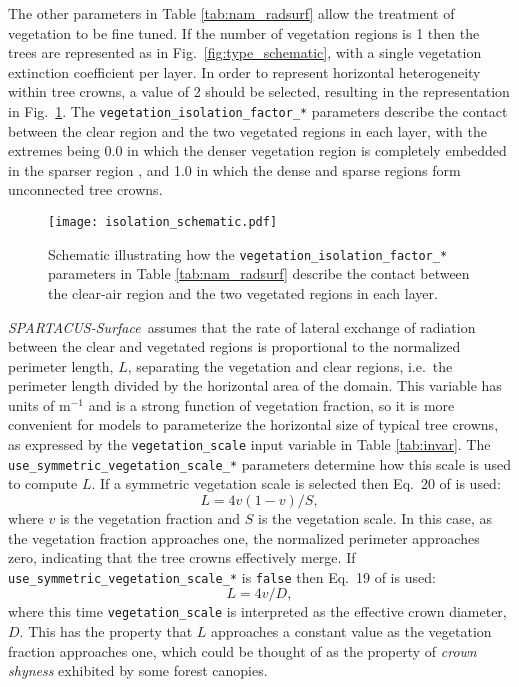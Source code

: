 \documentclass[a4,oneside]{article}
\def\codesize{\small}
\def\spsurf{\emph{SPARTACUS-Surface}}
\def\code#1{{\codesize\texttt{#1}}}
\begin{document}
The other parameters in Table \ref{tab:nam_radsurf} allow the
treatment of vegetation to be fine tuned. If the number of vegetation
regions is 1 then the trees are represented as in
Fig.\ \ref{fig:type_schematic}, with a single vegetation extinction
coefficient per layer.  In order to represent horizontal heterogeneity
within tree crowns, a value of 2 should be selected, resulting in the
representation in Fig.\ \ref{fig:isolation_schematic}. The
\code{vegetation\_isolation\_factor\_*} parameters describe the
contact between the clear region and the two vegetated regions in each
layer, with the extremes being 0.0 in which the denser vegetation
region is completely embedded in the sparser region \cite[the
  assumption used by][]{Hogan+2018}, and 1.0 in which the dense and
sparse regions form unconnected tree crowns.

\begin{figure}[b!]
  \centerline{\texttt{[image: isolation\_schematic.pdf]}}
  \caption{\label{fig:isolation_schematic}Schematic illustrating how
    the \code{vegetation\_isolation\_factor\_*} parameters in Table
    \ref{tab:nam_radsurf} describe the contact between the clear-air
    region and the two vegetated regions in each layer.}
\end{figure}

\spsurf\ assumes that the rate of lateral exchange of radiation
between the clear and vegetated regions is proportional to the
normalized perimeter length, $L$, separating the vegetation and clear
regions, i.e.\ the perimeter length divided by the horizontal area of
the domain. This variable has units of m$^{-1}$ and is a strong
function of vegetation fraction, so it is more convenient for models to
parameterize the horizontal size of typical tree crowns, as expressed
by the \code{vegetation\_scale} input variable in Table
\ref{tab:invar}. The \code{use\_symmetric\_vegetation\_scale\_*}
parameters determine how this scale is used to compute $L$.  If a
symmetric vegetation scale is selected then Eq.\ 20 of
\cite{Hogan+2018} is used:
%
\begin{equation}
  L=4v(1-v)/S,\label{eq:S}
\end{equation}
%
where $v$ is the vegetation fraction and $S$ is the vegetation scale.
In this case, as the vegetation fraction approaches one, the
normalized perimeter approaches zero, indicating that the tree crowns
effectively merge. If \code{use\_symmetric\_vegetation\_scale\_*} is
\code{false} then Eq.\ 19 of \cite{Hogan+2018} is used:
%
\begin{equation}
  L=4v/D,\label{eq:D}
\end{equation}
%
where this time \code{vegetation\_scale} is interpreted as the
effective crown diameter, $D$. This has the property that $L$
approaches a constant value as the vegetation fraction approaches one,
which could be thought of as the property of \emph{crown shyness}
exhibited by some forest canopies.
\end{document}
